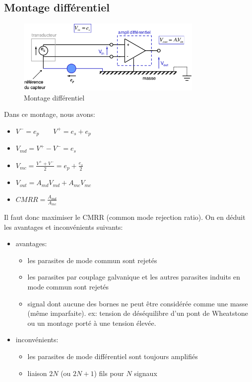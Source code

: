 \subsection{Montage différentiel}
\begin{figure}[H] 
	\centering 
	\includegraphics[width=0.8\textwidth,height=10\baselineskip,keepaspectratio]{ch3/image13} 
	\caption{Montage différentiel} 
\end{figure}
Dans ce montage, nous avons:
\begin{itemize}
		\item { \(V^-=e_p\qquad V^+=e_s+e_p\)} 
		\item { \(V_{md} = V^+-V^-=e_s\)} 
		\item { \(V_{mc}=\frac{V^++V^-}{2}=e_p+\frac{e_s}{2}\)} 
		\item { \(V_{out}=A_{md}V_{md}+A_{mc}V_{mc}\)} 
		\item { \(CMRR = \frac{A_{md}}{A_{mc}}\)} 
\end{itemize}
Il faut donc maximiser le CMRR (common mode rejection ratio). On en déduit les avantages et inconvénients suivants:
\begin{itemize}
	\item avantages:
	\begin{itemize}
		\item les parasites de mode commun sont rejetés
		\item les parasites par couplage galvanique et les autres parasites induits en mode commun sont rejetés
		\item signal dont aucune des bornes ne peut être considérée comme une masse (même imparfaite). ex: tension de déséquilibre d'un pont de Wheatstone ou un montage porté à une tension élevée.
	\end{itemize}
	\item inconvénients:
	\begin{itemize}
		\item les parasites de mode différentiel sont toujours amplifiés
		\item liaison \(2N\) (ou \(2N+1\)) fils pour \(N\) signaux
	\end{itemize}
\end{itemize}
